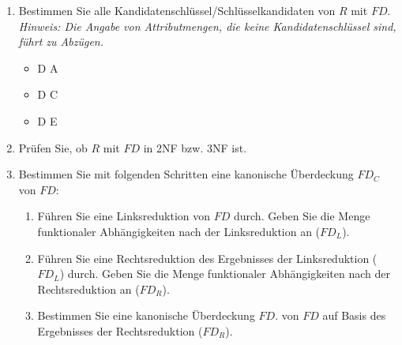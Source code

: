 \documentclass{lehramt-informatik-aufgabe}
\begin{document}
\begin{enumerate}


\item Bestimmen Sie alle Kandidatenschlüssel/Schlüsselkandidaten von $R$
mit $FD$. \textit{Hinweis: Die Angabe von Attributmengen, die keine
Kandidatenschlüssel sind, führt zu Abzügen.}

\begin{liAntwort}
\begin{itemize}
\item D A
\item D C
\item D E
\end{itemize}
\end{liAntwort}


\item Prüfen Sie, ob $R$ mit $FD$ in 2NF bzw. 3NF ist.

\begin{liAntwort}

\end{liAntwort}


\item Bestimmen Sie mit folgenden Schritten eine kanonische Überdeckung
$FD_C$ von $FD$:

\begin{enumerate}


\item Führen Sie eine Linksreduktion von $FD$ durch. Geben Sie die Menge
funktionaler Abhängigkeiten nach der Linksreduktion an ($FD_L$).

\begin{liAntwort}
\end{liAntwort}


\item Führen Sie eine Rechtsreduktion des Ergebnisses der Linksreduktion
($FD_L$) durch. Geben Sie die Menge funktionaler Abhängigkeiten nach der
Rechtsreduktion an ($FD_R$).

\begin{liAntwort}
\end{liAntwort}


\item Bestimmen Sie eine kanonische Überdeckung $FD$. von $FD$ auf Basis
des Ergebnisses der Rechtsreduktion ($FD_R$).


\end{enumerate}
\end{enumerate}
\end{document}
